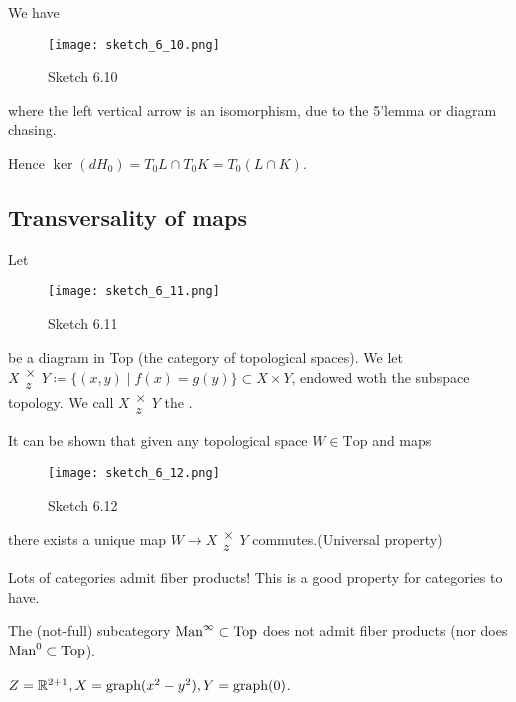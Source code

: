 \begin{remark}
    We have 
    \begin{figure}[H]
        \centering
        \texttt{[image: sketch\_6\_10.png]}
        \caption{Sketch 6.10}
    \end{figure}
    where the left vertical arrow is an isomorphism, due to the 5'lemma or diagram chasing.

    Hence \(\ker (dH_0)=T_0L\cap T_0K=T_0(L\cap K)\).
\end{remark}

\subsection{Transversality of maps}

\begin{definition*} %
    Let \begin{figure}[H]
        \centering
        \texttt{[image: sketch\_6\_11.png]}
        \caption{Sketch 6.11}
    \end{figure}
    be a diagram in Top (the category of topological spaces). We let \(X\substack{\times\\z} Y \coloneqq \{(x,y)\mid f(x)=g(y)\}\subset X\times Y\),
    endowed woth the subspace topology. We call \(X\substack{\times\\z} Y\) the .
\end{definition*}

\begin{remark}
It can be shown that given any topological space \(W\in \text{Top}\) and maps 
\begin{figure}[H]
    \centering
    \texttt{[image: sketch\_6\_12.png]}
    \caption{Sketch 6.12}
\end{figure}
there exists a unique map \(W\to X\substack{\times\\ z} Y\) commutes.(Universal property)
\end{remark}

Lots of categories admit fiber products! This is a good property for categories to have. 

 The (not-full) subcategory \(\text{Man}^\infty\subset\text{Top}\) does not admit 
fiber products (nor does \(\man0\subset\text{Top}\)). 
\begin{example}
    \(Z=\mathbb{R}^{2+1},X=\text{graph}(x^2-y^2),Y=\text{graph(0)}\).
\end{example} 

